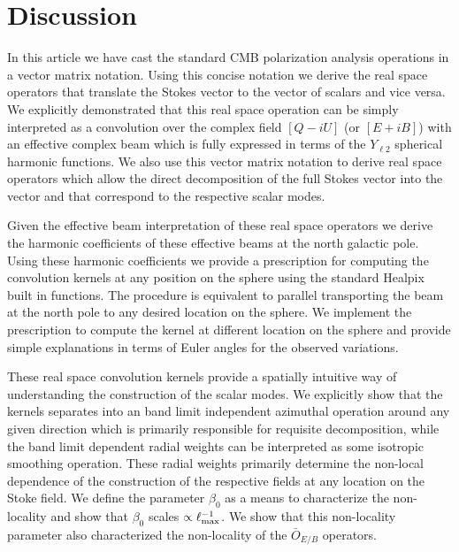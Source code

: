 \section{Discussion}\label{sec:discussion}

In this article we have cast the standard CMB polarization analysis operations in a vector matrix notation. Using this concise notation we derive the real space operators that translate the Stokes vector \vp{} to  the vector of scalars \vs and vice versa. We explicitly demonstrated that this real space operation can be simply interpreted as a convolution over the complex field $[Q - i U]$ (or $[E + iB]$) with an effective complex beam which is fully expressed in terms of the $Y_{\ell 2}$ spherical harmonic functions. We also use this vector matrix notation to derive real space operators which allow the direct decomposition of the full Stokes vector \vp{} into the vector  and  that correspond to the respective scalar modes. 

Given the effective beam interpretation of these real space operators we derive the harmonic coefficients of these effective beams at the north galactic pole. Using these harmonic coefficients we provide a prescription for computing the convolution kernels at any position on the sphere using the standard Healpix built in functions. The procedure is equivalent to parallel transporting the beam at the north pole to any desired location on the sphere. We implement the prescription to compute the  kernel at different location on the sphere and provide simple explanations in terms of Euler angles for the observed variations.

These real space convolution kernels provide a spatially intuitive way of understanding the construction of the scalar modes. We explicitly show that the kernels separates into an band limit independent azimuthal operation around any given direction which is primarily responsible for requisite decomposition, while the band limit dependent radial weights can be interpreted as some isotropic smoothing operation. These radial weights primarily determine the non-local dependence of the construction of the respective fields at any location on the Stoke field. We define the parameter $\beta_0$ as a means to characterize the non-locality and show that $\beta_0$ scales $\propto \ell_{\rm max}^{-1}$. We show that this non-locality parameter also characterized the non-locality of the $\bar{O}_{E/B}$ operators. 

